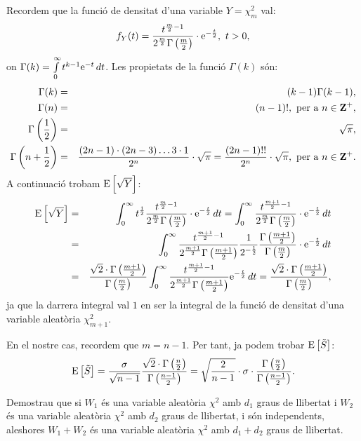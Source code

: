 {Recordem que la funci\'o de densitat d'una variable $Y=\chi^2_m$ val:
\[
f_Y (t)=\frac{t^{\frac{m}{2}-1}}{2^{\frac{m}{2}}\Gamma\left(\frac{m}{2}\right)}\cdot 
{\rm e}^{-\frac{t}{2}},\ t>0,
\]
on $\Gamma (k)= \int\limits_0^\infty t^{k-1} {\rm e}^{-t}\, dt$. Les 
propietats de la funci\'o $\Gamma (k)$ s\'on:
\begin{eqnarray*}
\Gamma (k) & = & (k-1) \Gamma(k-1), \\
\Gamma (n) & = & (n-1)!,\ \mbox{per a } n\in\ZZ^+, \\
\Gamma \left(\frac{1}{2}\right) & = & \sqrt{\pi}, \\ 
\Gamma \left( n+\frac{1}{2}\right) & = & \frac{(2 n-1)\cdot (2n-3)\ldots 
3\cdot 1}{2^n}\cdot\sqrt{\pi}=\frac{(2n-1)!!}{2^n}\cdot\sqrt{\pi},\ 
\mbox{per a } n\in\ZZ^+.
\end{eqnarray*}
A continuaci\'o trobam ${\rm E}\left[\sqrt{Y}\right]$:
\begin{eqnarray*}
	{\rm E}\left[\sqrt{Y}\right] & = & \int_0^\infty t^{\frac{1}{2}} 
	\frac{t^{\frac{m}{2}-1}}{2^{\frac{m}{2}}\Gamma\left(\frac{m}{2}\right)}\cdot 
{\rm e}^{-\frac{t}{2}}\, dt =\int_0^\infty 
\frac{t^{\frac{m+1}{2}-1}}{2^{\frac{m}{2}}\Gamma\left(\frac{m}{2}\right)}\cdot 
{\rm e}^{-\frac{t}{2}} \, dt\\
	 & = & \int_0^\infty 
	 \frac{t^{\frac{m+1}{2}-1}}{2^{\frac{m+1}{2}}\Gamma\left(\frac{m+1}{2}\right)} 
	 \frac{1}{2^{-\frac{1}{2}}}\frac{\Gamma\left(\frac{m+1}{2}\right)}
	{\Gamma\left(\frac{m}{2}  \right)}\cdot {\rm e}^{-\frac{t}{2}}\, dt 
	\\ & = & \frac{\sqrt{2}\cdot\Gamma\left(\frac{m+1}{2}\right)}
	{\Gamma\left(\frac{m}{2}\right)}
	\int_0^\infty 
	 \frac{t^{\frac{m+1}{2}-1}}{2^{\frac{m+1}{2}}\Gamma\left(\frac{m+1}{2}\right)}{\rm e}^{-\frac{t}{2}}\, 
	 dt = \frac{\sqrt{2}\cdot\Gamma\left(\frac{m+1}{2}\right)}
	{\Gamma\left(\frac{m}{2}\right)},
\end{eqnarray*}
ja que la darrera integral val $1$ en ser la integral 
de la funci\'o de densitat d'una variable aleat\`oria $\chi^2_{m+1}$.

En el nostre cas, recordem que $m=n-1$. Per tant, ja podem trobar 
${\rm E}\left[\tilde{S}\right]$:
\[
{\rm E}\left[\tilde{S}\right] 
=\frac{\sigma}{\sqrt{n-1}}\frac{\sqrt{2}\cdot
\Gamma\left(\frac{n}{2}\right)}{\Gamma\left(\frac{n-1}{2}
\right)}=\sqrt{\frac{2}{n-1}}\cdot\sigma\cdot
\frac{\Gamma\left(\frac{n}{2}\right)}{\Gamma\left(\frac{n-1}{2}\right)}.
\]}

\begin{probres}
{Demostrau que si $W_1$ \'es una variable aleat\`oria $\chi^2$ amb $d_1$
graus de llibertat i $W_2$ \'es una variable aleat\`oria $\chi^2$ amb
$d_2$ graus de llibertat, i s\'on independents, aleshores $W_1 +W_2$
 \'es una variable aleat\`oria $\chi^2$ amb $d_1 + d_2$ graus de llibertat.}
\etiqueta{SUMACHIQUADRAT}
\end{probres}

